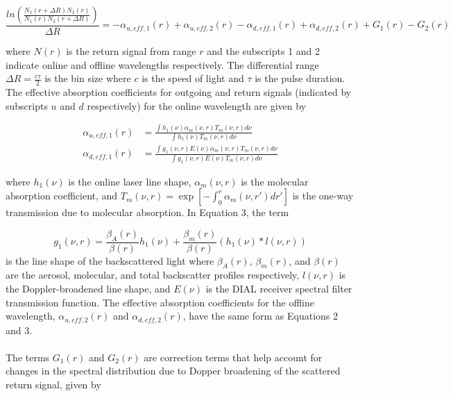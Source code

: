 \documentclass[twoside]{article}
\begin{document}
\begin{equation}
	\frac{ln\left(\frac{N_1(r+\Delta R) N_2(r)}{N_1(r) N_2(r+\Delta R)}\right)}{\Delta R} = -\alpha_{u,eff,1}(r) + \alpha_{u,eff,2}(r) -\alpha_{d,eff,1}(r) +\alpha_{d,eff,2}(r) + G_1(r) - G_2(r)
\end{equation}

\noindent where $N(r)$ is the return signal from range $r$ and the subscripts 1 and 2 indicate online and offline wavelengths respectively. The differential range $\Delta R = \frac{c \tau}{2}$ is the bin size where $c$ is the speed of light and $\tau$ is the pulse duration. The effective absorption coefficients for outgoing and return signals (indicated by subscripts $u$ and $d$ respectively) for the online wavelength are given by

\begin{align}
	\alpha_{u,eff,1}(r) &= \frac{\int h_1(\nu) \alpha_m(\nu,r) T_m(\nu,r) d\nu}{\int h_1(\nu) T_m(\nu,r) d\nu}\\
	\alpha_{d,eff,1}(r) &= \frac{\int g_1(\nu,r) E(\nu) \alpha_m(\nu,r) T_m(\nu,r) d\nu}{\int g_1(\nu,r) E(\nu) T_m(\nu,r) d\nu}
\end{align}

\noindent where $h_1(\nu)$ is the online laser line shape, $\alpha_m(\nu,r)$ is the molecular absorption coefficient, and $T_m(\nu,r) = \exp\left[-\int^r_0 \alpha_m(\nu,r')dr'\right]$ is the one-way transmission due to molecular absorption. In Equation 3, the term

\begin{equation}
	g_1(\nu,r) = \frac{\beta_A(r)}{\beta(r)} h_1(\nu) + \frac{\beta_m(r)}{\beta(r)} (h_1(\nu)\ast l(\nu,r))
\end{equation}
\noindent is the line shape of the backscattered light where $\beta_A(r)$, $\beta_m(r)$, and $\beta(r)$ are the aerosol, molecular, and total backscatter profiles respectively, $l(\nu,r)$ is the Doppler-broadened line shape, and $E(\nu)$ is the DIAL receiver spectral filter transmission function. The effective absorption coefficients for the offline wavelength, $\alpha_{u,eff,2}(r)$ and $\alpha_{d,eff,2}(r)$, have the same form as Equations 2 and 3.
\\
\\
The terms $G_1(r)$ and $G_2(r)$ are correction terms that help account for changes in the spectral distribution due to Dopper broadening of the scattered return signal, given by
\end{document}
